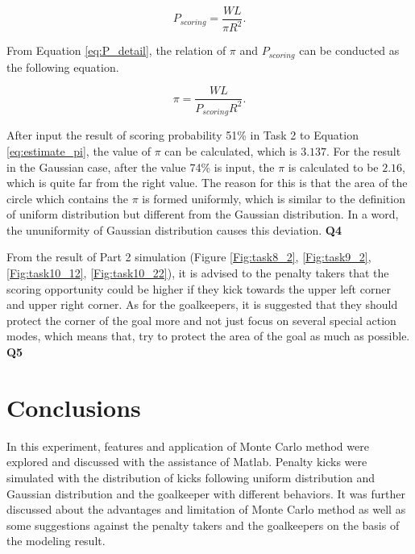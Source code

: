 \documentclass[11pt, a4paper]{article}
\begin{document}
\begin{equation}
P_{scoring} = \frac{WL}{\pi R^2}.
\label{eq:P_detail}
\end{equation}

From Equation \ref{eq:P_detail}, the relation of $\pi$ and $P_{scoring}$ can be conducted as the following equation.

\begin{equation}
\pi = \frac{WL}{P_{scoring} R^2}.
\label{eq:estimate_pi}
\end{equation}

After input the result of scoring probability 51\% in Task 2 to Equation \ref{eq:estimate_pi}, the value of $\pi$ can be calculated, which is $3.137$. For the result in the Gaussian case, after the value 74\% is input, the $\pi$ is calculated to be $2.16$, which is quite far from the right value. The reason for this is that the area of the circle which contains the $\pi$ is formed uniformly, which is similar to the definition of uniform distribution but different from the Gaussian distribution. In a word, the ununiformity of Gaussian distribution causes this deviation. \textbf{Q4}

From the result of Part 2 simulation (Figure \ref{Fig:task8_2}, \ref{Fig:task9_2}, \ref{Fig:task10_12}, \ref{Fig:task10_22}), it is advised to the penalty takers that the scoring opportunity could be higher if they kick towards the upper left corner and upper right corner. As for the goalkeepers, it is suggested that they should protect the corner of the goal more and not just focus on several special action modes, which means that, try to protect the area of the goal as much as possible. \textbf{Q5}

\section{Conclusions}

In this experiment, features and application of Monte Carlo method were explored and discussed with the assistance of Matlab. Penalty kicks were simulated with the distribution of kicks following uniform distribution and Gaussian distribution and the goalkeeper with different behaviors. It was further discussed about the advantages and limitation of Monte Carlo method as well as some suggestions against the penalty takers and the goalkeepers on the basis of the modeling result.
\end{document}
